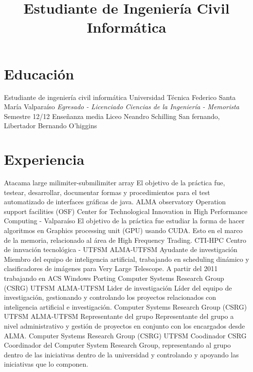 \documentclass[11pt,a4paper]{moderncv}
\title{Estudiante de Ingeniería Civil Informática}
\begin{document}
\maketitle

\section{Educación}
	{Estudiante de ingeniería civil informática}
	{Universidad Técnica Federico Santa María}
	{Valparaíso}
	{\emph{Egresado - Licenciado Ciencias de la Ingeniería - Memorista}}
	{Semestre 12/12}
	{Enseñanza media}
	{Liceo Neandro Schilling}
	{San fernando, Libertador Bernando O'higgins}
	{}{}

\section{Experiencia}
	{Atacama large milimiter-submilimiter array}
	{El objetivo de la práctica fue, testear, desarrollar, documentar formas y procedimientos para el test automatizado de 
	interfaces gráficas de java.}
	{ALMA observatory}
	{Operation support facilities (OSF)}
	{}
	{Center for Technological Innovation in High Performance Computing - Valparaíso}
	{El objetivo de la práctica fue estudiar la forma de hacer algoritmos en Graphics processing unit (GPU) usando CUDA. Esto en el marco
	de la memoria, relacionado al área de High Frequency Trading.}
	{CTI-HPC}
	{Centro de innvación tecnológica - UTFSM}
	{}
	{ALMA-UTFSM Ayudante de investigación}
	{Miembro del equipo de inteligencia artificial, trabajando en scheduling dinámico y clasificadores de imágenes para Very Large Telescope. 
		A partir del 2011 trabajando en ACS Windows Porting}
	{Computer Systems Research Group (CSRG)}
	{UTFSM}
	{}
	{ALMA-UTFSM Lider de investigación}
	{Líder del equipo de investigación, gestionando y controlando los proyectos relacionados con inteligencia artificial e investigación.}
	{Computer Systems Research Group (CSRG)}
	{UTFSM}
	{}
	{ALMA-UTFSM Representante del grupo}
	{Representante del grupo a nivel administrativo y gestión de proyectos en conjunto con los encargados desde ALMA.}
	{Computer Systems Research Group (CSRG)}
	{UTFSM}
	{}
	{Coodinador CSRG}
	{Coordinador del Computer System Research Group, representando al grupo dentro de las iniciativas dentro de la universidad
		y controlando y apoyando las iniciativas que lo componen.}
\end{document}
